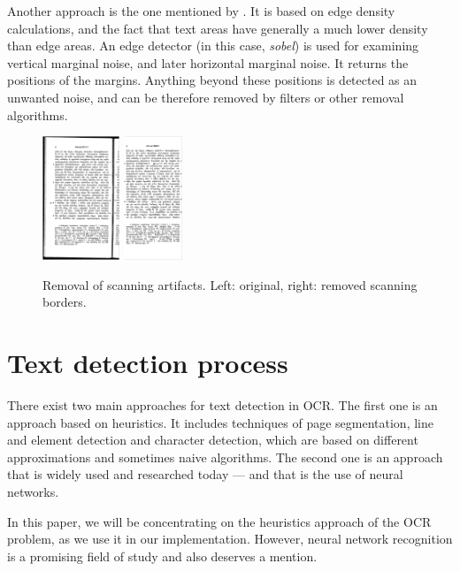 Another approach is the one mentioned by \citet{marginalNoiseEdge}. It is based on edge density calculations, and the fact that text areas have generally a much lower density than edge areas. An edge detector (in this case, \emph{sobel}) is used for examining vertical marginal noise, and later horizontal marginal noise. It returns the positions of the margins. Anything beyond these positions is detected as an unwanted noise, and can be therefore removed by filters or other removal algorithms.

\begin{figure}
\centering

\includegraphics[height=10em]{img/preprocessing/scan_borders_orig.png}
\qquad
\includegraphics[height=10em]{img/preprocessing/scan_borders_result.png}

\caption{Removal of scanning artifacts. Left: original, right: removed scanning borders.}
\label{fig:scanning}
\end{figure}

\section{Text detection process}

There exist two main approaches for text detection in OCR. The first one is an approach based on heuristics. It includes techniques of page segmentation, line and element detection and character detection, which are based on different approximations and sometimes naive algorithms. The second one is an approach that is widely used and researched today --- and that is the use of neural networks.

In this paper, we will be concentrating on the heuristics approach of the OCR problem, as we use it in our implementation. However, neural network recognition is a promising field of study and also deserves a mention.

